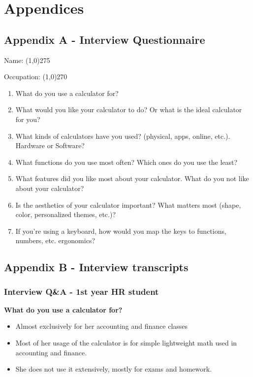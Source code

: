 \documentclass[a4paper]{article}
\begin{document}
\pagebreak
\section{Appendices}

\subsection{Appendix A - Interview Questionnaire}

\vspace{1in}
{}
{}

\begin{center}Name: \line(1,0){275} \end{center}
\begin{center}Occupation: \line(1,0){270} \end{center}

{}

\begin{enumerate}
\item What do you use a calculator for?
\item What would you like your calculator to do? Or what is the ideal calculator for you?
\item What kinds of calculators have you used? (physical, apps, online, etc.). Hardware or Software? 
\item What functions do you use most often? Which ones do you use the least?
\item What features did you like most about your calculator. What do you not like about your calculator?
\item Is the aesthetics of your calculator important? What matters most (shape, color,  personalized themes, etc.)?
\item If you’re using a keyboard, how would you map the keys to functions, numbers, etc. ergonomics?
\end{enumerate}

\pagebreak

\subsection{Appendix B - Interview transcripts}

\subsubsection*{Interview Q\&A - 1st year HR student}
\textbf{What do you use a calculator for?}
\begin{itemize}
\itemsep0em 
\item Almost exclusively for her accounting and finance classes
\item Most of her usage of the calculator is for simple lightweight math used in accounting and finance.
\item She does not use it extensively, mostly for exams and homework.
\end{itemize}
\end{document}
